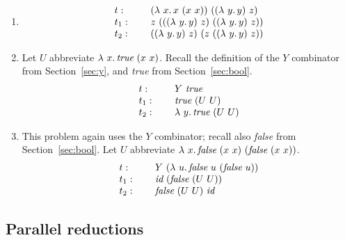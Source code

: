 \begin{enumerate}
\item
\[
  \begin{array}{lll}
    t: & \ & (\lambda\ x.\, x\ (x\ x))\ ((\lambda\ y.\, y)\ z) \\
    t_1: & \ & z\ (((\lambda\ y.\, y)\ z)\ ((\lambda\ y.\, y)\ z))\\
    t_2: & \ & ((\lambda\ y.\, y)\ z)\ (z\ ((\lambda\ y.\, y)\ z))
  \end{array}
  \]

\item Let $U$ abbreviate $\lam{x}{\textit{true}\ (x\ x)}$.  Recall the definition of the $Y$ combinator from Section~\ref{sec:y}, and \textit{true} from Section~\ref{sec:bool}.
  \[
  \begin{array}{lll}
    t: & \ & Y\ \textit{true} \\
    t_1: & \ & \textit{true}\ (U\ U) \\
    t_2: & \ & \lambda\ y.\, \textit{true}\ (U\ U)
  \end{array}
  \]
  
\item This problem again uses the $Y$ combinator; recall also \textit{false} from Section~\ref{sec:bool}.  Let
  $U$ abbreviate $\lam{x}{\textit{false}\ (x\ x)\ (\textit{false}\ (x\ x))}$. 
\[
  \begin{array}{lll}
    t: & \ & Y\ (\lam{u}{\textit{false}\ u\ (\textit{false}\ u)}) \\
    t_1: & \ & \textit{id}\ (\textit{false}\ (U\ U)) \\
    t_2: & \ & \textit{false}\ (U\ U)\ \textit{id}
  \end{array}
  \]

\end{enumerate}

\subsection{Parallel reductions}

